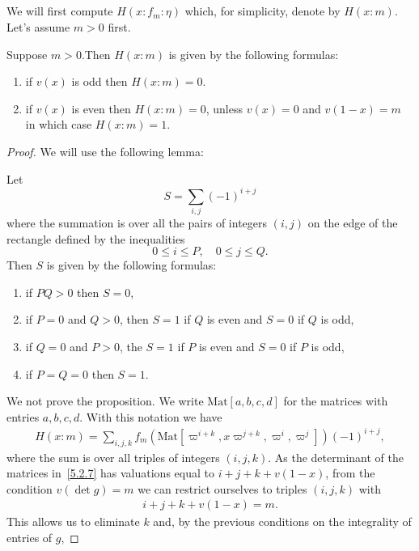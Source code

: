 \subsection{}
We will first compute $H(x:f_m:\eta)$ which, for simplicity, denote by $H(x:m)$.
Let's assume $m >0$ first.
\begin{proposition}\label{prop:5.2}
Suppose $m > 0$.Then $H(x:m)$ is given by the following formulas:
\begin{enumerate}
    \item if $v(x)$ is odd then $H(x:m)=0$.
    \item if $v(x)$ is even then $H(x:m)=0$, unless $v(x)=0$ and $v(1-x)=m$ in which case $H(x:m )=1$.
\end{enumerate}
\end{proposition}
\begin{proof}
We will use the following lemma:
\begin{lemma}
Let
\[
S = \sum_{i, j} (-1)^{i+j}
\]
where the summation is over all the pairs of integers $(i, j)$ on the edge of the rectangle defined by the inequalities
\[
0 \leq i \leq P, \quad 0 \leq j \leq Q.
\]
Then $S$ is given by the following formulas:
\begin{enumerate}
    \item if $PQ > 0$ then $S =0$,
    \item if $P = 0$ and $Q >0$, then $S=1$ if $Q$ is even and $S=0$ if $Q$ is odd,
    \item if $Q=0$ and $P >0$, the $S=1$ if $P$ is even and $S=0$ if $P$ is odd,
    \item if $P=Q=0$ then $S=1$.
\end{enumerate}
\end{lemma}
We not prove the proposition.
We write $\mathrm{Mat}[a, b, c, d]$ for the matrices with entries $a, b, c, d$.
With this notation we have
\begin{align}
\label{5.2.7}
    H(x:m) = \sum_{i, j, k} f_{m}(\mathrm{Mat}[\varpi^{i+k}, x\varpi^{j+k}, \varpi^{i}, \varpi^{j}]) (-1)^{i+j},
\end{align}
where the sum is over all triples of integers $(i, j, k)$.
As the determinant of the matrices in~\eqref{5.2.7} has valuations equal to $i+j+k+v(1-x)$, from the condition $v(\det g) = m$ we can restrict ourselves to triples $(i, j, k)$ with 
\begin{align*}
    i+j+k+v(1-x) = m.
\end{align*}
This allows us to eliminate $k$ and, by the previous conditions on the integrality of entries of $g$,

\end{proof}
